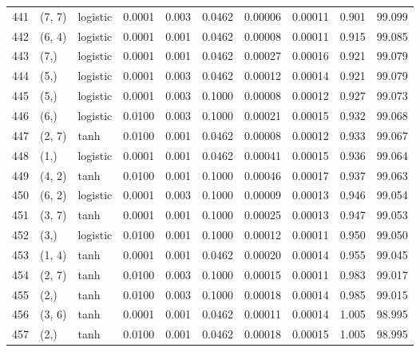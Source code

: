 \begin{tabular}{lllrrrrrrr}
441 &      (7, 7) &  logistic &  0.0001 &  0.003 &  0.0462 &          0.00006 &    0.00011 &       0.901 &    99.099 \\
442 &      (6, 4) &  logistic &  0.0001 &  0.001 &  0.0462 &          0.00008 &    0.00011 &       0.915 &    99.085 \\
443 &        (7,) &  logistic &  0.0001 &  0.001 &  0.0462 &          0.00027 &    0.00016 &       0.921 &    99.079 \\
444 &        (5,) &  logistic &  0.0001 &  0.003 &  0.0462 &          0.00012 &    0.00014 &       0.921 &    99.079 \\
445 &        (5,) &  logistic &  0.0001 &  0.003 &  0.1000 &          0.00008 &    0.00012 &       0.927 &    99.073 \\
446 &        (6,) &  logistic &  0.0100 &  0.003 &  0.1000 &          0.00021 &    0.00015 &       0.932 &    99.068 \\
447 &      (2, 7) &      tanh &  0.0100 &  0.001 &  0.0462 &          0.00008 &    0.00012 &       0.933 &    99.067 \\
448 &        (1,) &  logistic &  0.0001 &  0.001 &  0.0462 &          0.00041 &    0.00015 &       0.936 &    99.064 \\
449 &      (4, 2) &      tanh &  0.0100 &  0.001 &  0.1000 &          0.00046 &    0.00017 &       0.937 &    99.063 \\
450 &      (6, 2) &  logistic &  0.0001 &  0.003 &  0.1000 &          0.00009 &    0.00013 &       0.946 &    99.054 \\
451 &      (3, 7) &      tanh &  0.0001 &  0.001 &  0.1000 &          0.00025 &    0.00013 &       0.947 &    99.053 \\
452 &        (3,) &  logistic &  0.0100 &  0.001 &  0.1000 &          0.00012 &    0.00011 &       0.950 &    99.050 \\
453 &      (1, 4) &      tanh &  0.0001 &  0.001 &  0.0462 &          0.00020 &    0.00014 &       0.955 &    99.045 \\
454 &      (2, 7) &      tanh &  0.0100 &  0.003 &  0.1000 &          0.00015 &    0.00011 &       0.983 &    99.017 \\
455 &        (2,) &      tanh &  0.0100 &  0.003 &  0.1000 &          0.00018 &    0.00014 &       0.985 &    99.015 \\
456 &      (3, 6) &      tanh &  0.0001 &  0.001 &  0.0462 &          0.00011 &    0.00014 &       1.005 &    98.995 \\
457 &        (2,) &      tanh &  0.0100 &  0.001 &  0.0462 &          0.00018 &    0.00015 &       1.005 &    98.995 \\

\end{tabular}
